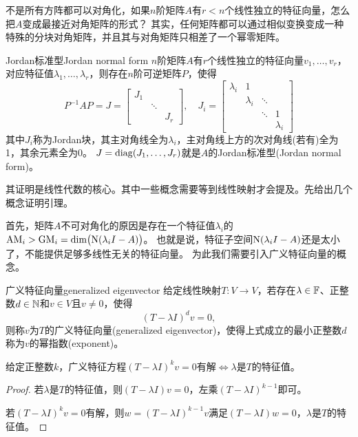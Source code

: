 
不是所有方阵都可以对角化，如果$n$阶矩阵$A$有$r<n$个线性独立的特征向量，怎么把$A$变成最接近对角矩阵的形式？
其实，任何矩阵都可以通过相似变换变成一种特殊的分块对角矩阵，并且其与对角矩阵只相差了一个幂零矩阵。

\begin{theorem}{Jordan标准型}{Jordan normal form}
	$n$阶矩阵$A$有$r$个线性独立的特征向量$v_1,\ldots,v_r$，对应特征值$\lambda_1,\ldots,\lambda_r$，则存在$n$阶可逆矩阵$P$，使得
	\[
		P^{-1}AP=J=\begin{bmatrix}
			J_1             \\
			 & \ddots       \\
			 &        & J_r
		\end{bmatrix},\quad
		J_i=\begin{bmatrix}
			\lambda_i & 1                              \\
			          & \lambda_i & \ddots             \\
			          &           & \ddots & 1         \\
			          &           &        & \lambda_i
		\end{bmatrix}
	\]
	其中$J_i$称为Jordan块，其主对角线全为$\lambda_i$，主对角线上方的次对角线(若有)全为1，其余元素全为0。
	$J=\operatorname{diag}(J_1,\ldots,J_r)$就是$A$的Jordan标准型(Jordan normal form)。
\end{theorem}

其证明是线性代数的核心。其中一些概念需要等到线性映射才会提及。先给出几个概念证明引理。

首先，矩阵$A$不可对角化的原因是存在一个特征值$\lambda_i$的$\mathrm{AM}_i>\mathrm{GM}_i=\dim\bigl(\operatorname{N}(\lambda_iI-A)\bigr)$。
也就是说，特征子空间$\operatorname{N}(\lambda_iI-A)$还是太小了，不能提供足够多线性无关的特征向量。
为此我们需要引入广义特征向量的概念。

\begin{definition}{广义特征向量}{generalized eigenvector}
	给定线性映射$T:V\to V$，若存在$\lambda\in\mathbb F$、正整数$d\in\mathbb N$和$v\in V$且$v\neq 0$，使得
	\[
		(T-\lambda I)^dv=0,
	\]
	则称$v$为$T$的广义特征向量(generalized eigenvector)，使得上式成立的最小正整数$d$称为$v$的幂指数(exponent)。
\end{definition}

\begin{theorem}{}{}
	给定正整数$k$，广义特征方程$(T-\lambda I)^kv=0$有解$\iff\lambda$是$T$的特征值。
\end{theorem}

\begin{proof}
	若$\lambda$是$T$的特征值，则$(T-\lambda I)v=0$，左乘$(T-\lambda I)^{k-1}$即可。
	
	若$(T-\lambda I)^kv=0$有解，则$w=(T-\lambda I)^{k-1}v$满足$(T-\lambda I)w=0$，$\lambda$是$T$的特征值。
\end{proof}

